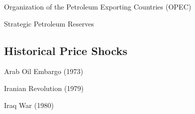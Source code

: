 \documentclass[10pt]{article}
\begin{document}
    \begin{core}{Organization of the Petroleum Exporting Countries (OPEC)}


    \end{core}

    \begin{core}{Strategic Petroleum Reserves}


    \end{core}

  \subsection{Historical Price Shocks}

    \begin{core}{Arab Oil Embargo (1973)}


    \end{core}

    \begin{core}{Iranian Revolution (1979)}

    \end{core}

    \begin{core}{Iraq War (1980)}

    \end{core}
\end{document}
